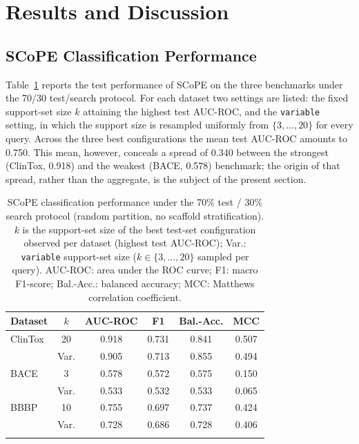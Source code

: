 \section{Results and Discussion}\label{sec:results}

\subsection{SCoPE Classification Performance}\label{subsec:perf}

Table~\ref{tab:scope_results} reports the test performance of SCoPE on the three
benchmarks under the 70/30 test/search protocol. For each dataset two settings
are listed: the fixed support-set size $k$ attaining the highest test AUC-ROC,
and the \texttt{variable} setting, in which the support size is resampled
uniformly from $\{3,\dots,20\}$ for every query. Across the three best
configurations the mean test AUC-ROC amounts to 0.750. This mean, however,
conceals a spread of 0.340 between the strongest (ClinTox, 0.918) and the
weakest (BACE, 0.578) benchmark; the origin of that spread, rather than the
aggregate, is the subject of the present section.

\begin{table}[!htb]
\caption{SCoPE classification performance under the 70\% test /
30\% search protocol (random partition, no scaffold stratification).
$k$ is the support-set size of the best test-set configuration
observed per dataset (highest test AUC-ROC); Var.: \texttt{variable} support-set
size ($k\in\{3,\dots,20\}$ sampled per query). AUC-ROC: area under the
ROC curve; F1: macro F1-score; Bal.-Acc.: balanced accuracy; MCC:
Matthews correlation coefficient.}\label{tab:scope_results}
\begin{tabular}{@{}lccccc@{}}
\toprule
Dataset & $k$ & AUC-ROC & F1 & Bal.-Acc. & MCC \\
\midrule
ClinTox & 20   & 0.918 & 0.731 & 0.841 & 0.507 \\
        & Var. & 0.905 & 0.713 & 0.855 & 0.494 \\
\midrule
BACE    &  3   & 0.578 & 0.572 & 0.575 & 0.150 \\
        & Var. & 0.533 & 0.532 & 0.533 & 0.065 \\
\midrule
BBBP    & 10   & 0.755 & 0.697 & 0.737 & 0.424 \\
        & Var. & 0.728 & 0.686 & 0.728 & 0.406 \\
\botrule
\end{tabular}
\end{table}

